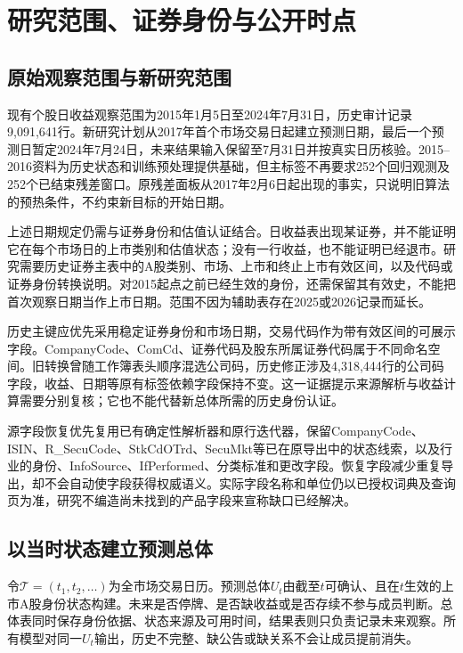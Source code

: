 \section{研究范围、证券身份与公开时点}
\subsection{原始观察范围与新研究范围}
现有个股日收益观察范围为2015年1月5日至2024年7月31日，历史审计记录9,091,641行。新研究计划从2017年首个市场交易日起建立预测日期，最后一个预测日暂定2024年7月24日，未来结果输入保留至7月31日并按真实日历核验。2015--2016资料为历史状态和训练预处理提供基础，但主标签不再要求252个回归观测及252个已结束残差窗口。原残差面板从2017年2月6日起出现的事实，只说明旧算法的预热条件，不约束新目标的开始日期。

上述日期规定仍需与证券身份和估值认证结合。日收益表出现某证券，并不能证明它在每个市场日的上市类别和估值状态；没有一行收益，也不能证明已经退市。研究需要历史证券主表中的A股类别、市场、上市和终止上市有效区间，以及代码或证券身份转换说明。对2015起点之前已经生效的身份，还需保留其有效史，不能把首次观察日期当作上市日期。范围不因为辅助表存在2025或2026记录而延长。

历史主键应优先采用稳定证券身份和市场日期，交易代码作为带有效区间的可展示字段。CompanyCode、ComCd、证券代码及股东所属证券代码属于不同命名空间。旧转换曾随工作簿表头顺序混选公司码，历史修正涉及4,318,444行的公司码字段，收益、日期等原有标签依赖字段保持不变。这一证据提示来源解析与收益计算需要分别复核；它也不能代替新总体所需的历史身份认证。


源字段恢复优先复用已有确定性解析器和原行迭代器，保留CompanyCode、ISIN、R\_SecuCode、StkCdOTrd、SecuMkt等已在原导出中的状态线索，以及行业的身份、InfoSource、IfPerformed、分类标准和更改字段。恢复字段减少重复导出，却不会自动使字段获得权威语义。实际字段名称和单位仍以已授权词典及查询页为准，研究不编造尚未找到的产品字段来宣称缺口已经解决。

\subsection{以当时状态建立预测总体}
令$\mathcal T=(t_1,t_2,\ldots)$为全市场交易日历。预测总体$U_t$由截至$t$可确认、且在$t$生效的上市A股身份状态构建。未来是否停牌、是否缺收益或是否存续不参与成员判断。总体表同时保存身份依据、状态来源及可用时间，结果表则只负责记录未来观察。所有模型对同一$U_t$输出，历史不完整、缺公告或缺关系不会让成员提前消失。

